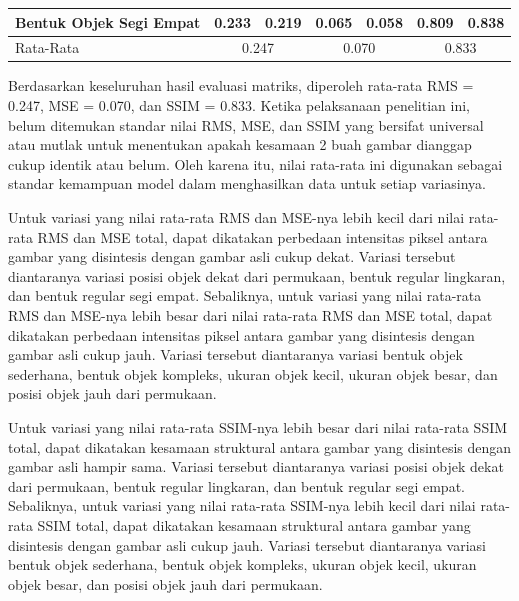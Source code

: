 \begin{table}[]
\begin{tabular}{|l|cc|cc|cc|}
  \multirow{-5}{*}{Bentuk Objek Segi Empat}  & \multicolumn{1}{c|}{\cellcolor[HTML]{FFFFFF}0.233} & \multirow{-5}{*}{\cellcolor[HTML]{FFFFFF}0.219} & \multicolumn{1}{c|}{\cellcolor[HTML]{FFFFFF}0.065} & \multirow{-5}{*}{\cellcolor[HTML]{FFFFFF}0.058} & \multicolumn{1}{c|}{\cellcolor[HTML]{FFFFFF}0.809} & \multirow{-5}{*}{\cellcolor[HTML]{FFFFFF}0.838} \\ \hline
  Rata-Rata                                           & \multicolumn{2}{c|}{\cellcolor[HTML]{FFFFFF}0.247}                                                    & \multicolumn{2}{c|}{0.070}                                                                              & \multicolumn{2}{c|}{0.833}                                                                           \\ \hline
  \end{tabular}
\end{table}

Berdasarkan keseluruhan hasil evaluasi matriks, diperoleh rata-rata RMS = 0.247, MSE = 0.070, dan SSIM = 0.833. 
Ketika pelaksanaan penelitian ini, belum ditemukan standar nilai RMS, MSE, dan SSIM yang bersifat universal atau mutlak untuk menentukan apakah kesamaan 2 buah gambar dianggap cukup identik atau belum. 
Oleh karena itu, nilai rata-rata ini digunakan sebagai standar kemampuan model dalam menghasilkan data untuk setiap variasinya.

Untuk variasi yang nilai rata-rata RMS dan MSE-nya lebih kecil dari nilai rata-rata RMS dan MSE total, dapat dikatakan perbedaan intensitas piksel antara gambar yang disintesis dengan gambar asli cukup dekat. 
Variasi tersebut diantaranya variasi posisi objek dekat dari permukaan, bentuk regular lingkaran, dan bentuk regular segi empat. 
Sebaliknya, untuk variasi yang nilai rata-rata RMS dan MSE-nya lebih besar dari nilai rata-rata RMS dan MSE total, dapat dikatakan perbedaan intensitas piksel antara gambar yang disintesis dengan gambar asli cukup jauh. 
Variasi tersebut diantaranya variasi bentuk objek sederhana, bentuk objek kompleks, ukuran objek kecil, ukuran objek besar, dan posisi objek jauh dari permukaan.

Untuk variasi yang nilai rata-rata SSIM-nya lebih besar dari nilai rata-rata SSIM total, dapat dikatakan kesamaan struktural antara gambar yang disintesis dengan gambar asli hampir sama. 
Variasi tersebut diantaranya variasi posisi objek dekat dari permukaan, bentuk regular lingkaran, dan bentuk regular segi empat. 
Sebaliknya, untuk variasi yang nilai rata-rata SSIM-nya lebih kecil dari nilai rata-rata SSIM total, dapat dikatakan kesamaan struktural antara gambar yang disintesis dengan gambar asli cukup jauh. 
Variasi tersebut diantaranya variasi bentuk objek sederhana, bentuk objek kompleks, ukuran objek kecil, ukuran objek besar, dan posisi objek jauh dari permukaan.

